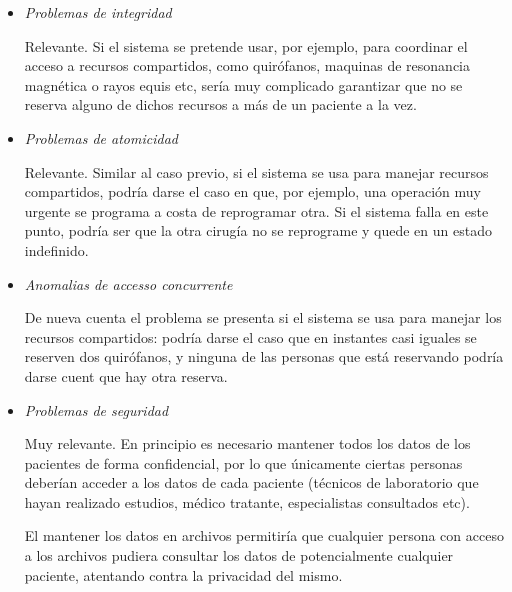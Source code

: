 \begin{itemize}
	\item \emph{Problemas de integridad}

	      Relevante. Si el sistema se pretende usar, por ejemplo, para coordinar el acceso a recursos compartidos, como quirófanos, maquinas de resonancia magnética o rayos equis etc, sería muy complicado garantizar que no se reserva alguno de dichos recursos a más de un paciente a la vez.

	\item \emph{Problemas de atomicidad}

	      Relevante. Similar al caso previo, si el sistema se usa para manejar recursos compartidos, podría darse el caso en que, por ejemplo, una operación muy urgente se programa a costa de reprogramar otra. Si el sistema falla en este punto, podría ser que la otra cirugía no se reprograme y quede en un estado indefinido.

	\item \emph{Anomalias de accesso concurrente}

	      De nueva cuenta el problema se presenta si el sistema se usa para manejar los recursos compartidos: podría darse el caso que en instantes casi iguales se reserven dos quirófanos, y ninguna de las personas que está reservando podría darse cuent que hay otra reserva.

	\item \emph{Problemas de seguridad}

	      Muy relevante. En principio es necesario mantener todos los datos de los pacientes de forma confidencial, por lo que únicamente ciertas personas deberían acceder a los datos de cada paciente (técnicos de laboratorio que hayan realizado estudios, médico tratante, especialistas consultados etc).

	      El mantener los datos en archivos permitiría que cualquier persona con acceso a los archivos pudiera consultar los datos de potencialmente cualquier paciente, atentando contra la privacidad del mismo.
\end{itemize}



